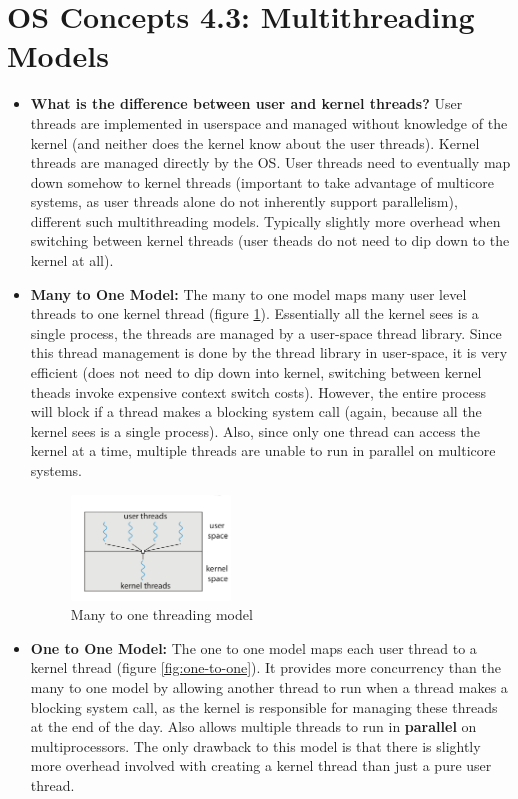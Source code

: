 \documentclass[12pt]{article}
\begin{document}
\section*{OS Concepts 4.3: Multithreading Models}

\begin{itemize}
    \item \textbf{What is the difference between user and kernel threads?} User threads are implemented in userspace and managed without knowledge of the kernel (and neither does the kernel know about the user threads). Kernel threads are managed directly by the OS. User threads need to eventually map down somehow to kernel threads (important to take advantage of multicore systems, as user threads alone do not inherently support parallelism), different such multithreading models. Typically slightly more overhead when switching between kernel threads (user theads do not need to dip down to the kernel at all).
    \item \textbf{Many to One Model:} The many to one model maps many user level threads to one kernel thread (figure \ref{fig:many-to-one}). Essentially all the kernel sees is a single process, the threads are managed by a user-space thread library. Since this thread management is done by the thread library in user-space, it is very efficient (does not need to dip down into kernel, switching between kernel theads invoke expensive context switch costs). However, the entire process will block if a thread makes a blocking system call (again, because all the kernel sees is a single process). Also, since only one thread can access the kernel at a time, multiple threads are unable to run in parallel on multicore systems.
        \begin{figure}[ht]
            \centering
            \includegraphics[width=0.4\textwidth]{figures/many-to-one.jpg}
            \caption{Many to one threading model}
            \label{fig:many-to-one}
        \end{figure}
    \item \textbf{One to One Model:} The one to one model maps each user thread to a kernel thread (figure \ref{fig:one-to-one}). It provides more concurrency than the many to one model by allowing another thread to run when a thread makes a blocking system call, as the kernel is responsible for managing these threads at the end of the day. Also allows multiple threads to run in \textbf{parallel} on multiprocessors. The only drawback to this model is that there is slightly more overhead involved with creating a kernel thread than just a pure user thread.

\end{itemize}
\end{document}
